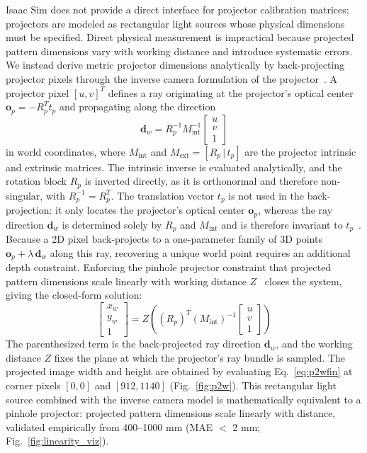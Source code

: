 \documentclass[journal,twoside,web]{ieeecolor}
\begin{document}
Isaac Sim does not provide a direct interface for projector calibration matrices; projectors
are modeled as rectangular light sources whose physical dimensions must be specified.
Direct physical measurement is impractical because projected pattern dimensions vary with
working distance and introduce systematic errors.
We instead derive metric projector dimensions analytically by back-projecting projector pixels through the inverse camera formulation of the projector~\cite{martynov2011projector,hartley2003pinhole}. A projector pixel $[u, v]^T$ defines a ray originating at the projector's optical center $\mathbf{o}_p = -R_p^T t_p$ and propagating along the direction
\begin{equation}\label{eq:rayworld}
\mathbf{d}_w = R_p^{-1} M_{\text{int}}^{-1}\begin{bmatrix} u \\ v \\ 1 \end{bmatrix}
\end{equation}
in world coordinates, where $M_{\text{int}}$ and $M_{\text{ext}} = [R_p\,|\,t_p]$
are the projector intrinsic and extrinsic matrices. The intrinsic inverse is
evaluated analytically, and the rotation block $R_p$ is inverted directly, as it
is orthonormal and therefore non-singular, with $R_p^{-1} = R_p^T$. The
translation vector $t_p$ is not used in the back-projection: it only locates the
projector's optical center $\mathbf{o}_p$, whereas the ray direction
$\mathbf{d}_w$ is determined solely by $R_p$ and $M_{\text{int}}$ and is therefore
invariant to $t_p$~\cite{hartley2003pinhole}. Because a 2D pixel back-projects to
a one-parameter family of 3D points $\mathbf{o}_p + \lambda\,\mathbf{d}_w$ along
this ray, recovering a unique world point requires an additional depth
constraint. Enforcing the pinhole projector constraint that projected pattern
dimensions scale linearly with working distance $Z$~\cite{hartley2003pinhole}
closes the system, giving the closed-form solution:
\begin{equation}\label{eq:p2wfin}
\begin{bmatrix} x_w \\ y_w \\ 1 \end{bmatrix}
= Z\!\left(\left(R_p\right)^{T}\!\left(M_{\text{int}}\right)^{-1}
\begin{bmatrix} u \\ v \\ 1 \end{bmatrix}\right)
\end{equation}
The parenthesized term is the back-projected ray direction $\mathbf{d}_w$,
and the working distance $Z$ fixes the plane at which the projector's ray bundle
is sampled.
The projected image width and height are obtained by evaluating Eq.~\ref{eq:p2wfin} at
corner pixels $[0,0]$ and $[912,1140]$ (Fig.~\ref{fig:p2w}).
This rectangular light source combined with the inverse camera model is mathematically
equivalent to a pinhole projector: projected pattern dimensions scale linearly with
distance, validated empirically from 400--1000 mm (MAE $<$ 2 mm;
Fig.~\ref{fig:linearity_viz}).
\end{document}
